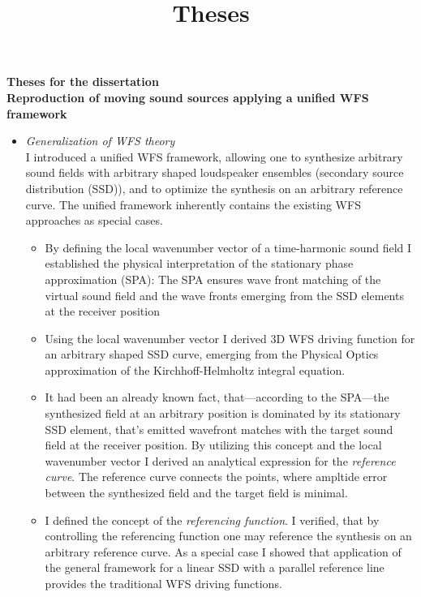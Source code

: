 \documentclass[a4paper,10pt]{article}
\title{Theses}
\date{}
\begin{document}
\begin{center}
  \textbf{\normalsize Theses for the dissertation \\
   		  \Large Reproduction of moving sound sources applying a unified WFS framework}\\[0.5cm]
\end{center}

\begin{itemize}
\item \emph{Generalization of WFS theory} \\ 
I introduced a unified WFS framework, allowing one to synthesize arbitrary sound fields with arbitrary shaped loudspeaker ensembles (secondary source distribution (SSD)), and to optimize the synthesis on an arbitrary reference curve. 
The unified framework inherently contains the existing WFS approaches as special cases.
\begin{itemize}
\item By defining the local wavenumber vector of a time-harmonic sound field I established the physical interpretation of the stationary phase approximation (SPA):
The SPA ensures wave front matching of the virtual sound field and the wave fronts emerging from the SSD elements at the receiver position
\item Using the local wavenumber vector I derived 3D WFS driving function for an arbitrary shaped SSD curve, emerging from the Physical Optics approximation of the Kirchhoff-Helmholtz integral equation.
\item It had been an already known fact, that---according to the SPA---the synthesized field at an arbitrary position is dominated by its stationary SSD element, that's emitted wavefront matches with the target sound field at the receiver position.
By utilizing this concept and the local wavenumber vector I derived an analytical expression for the \emph{reference curve}. The reference curve connects the points, where ampltide error between the synthesized field and the target field is minimal.
\item I defined the concept of the \emph{referencing function}.
I verified, that by controlling the referencing function one may reference the synthesis on an arbitrary reference curve.
As a special case I showed that application of the general framework for a linear SSD with a parallel reference line provides the traditional WFS driving functions.

\end{itemize}
\end{itemize}
\end{document}
